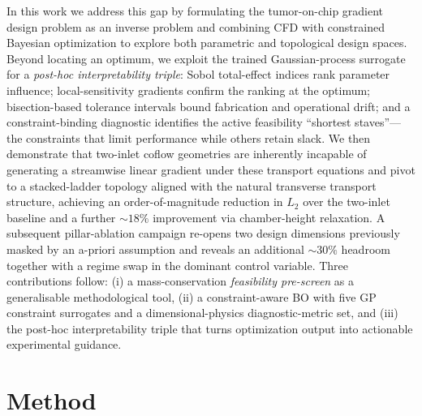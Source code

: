\documentclass[12pt]{article}
\begin{document}
In this work we address this gap by formulating the tumor-on-chip gradient design problem as an inverse problem and combining CFD with constrained Bayesian optimization to explore both parametric and topological design spaces. Beyond locating an optimum, we exploit the trained Gaussian-process surrogate for a \emph{post-hoc interpretability triple}: Sobol total-effect indices rank parameter influence; local-sensitivity gradients confirm the ranking at the optimum; bisection-based tolerance intervals bound fabrication and operational drift; and a constraint-binding diagnostic identifies the active feasibility ``shortest staves''---the constraints that limit performance while others retain slack. We then demonstrate that two-inlet coflow geometries are inherently incapable of generating a streamwise linear gradient under these transport equations and pivot to a stacked-ladder topology aligned with the natural transverse transport structure, achieving an order-of-magnitude reduction in $L_2$ over the two-inlet baseline and a further $\sim 18\%$ improvement via chamber-height relaxation. A subsequent pillar-ablation campaign re-opens two design dimensions previously masked by an a-priori assumption and reveals an additional $\sim 30\%$ headroom together with a regime swap in the dominant control variable. Three contributions follow: (i) a mass-conservation \emph{feasibility pre-screen} as a generalisable methodological tool, (ii) a constraint-aware BO with five GP constraint surrogates and a dimensional-physics diagnostic-metric set, and (iii) the post-hoc interpretability triple that turns optimization output into actionable experimental guidance.

\section{Method}
\end{document}

